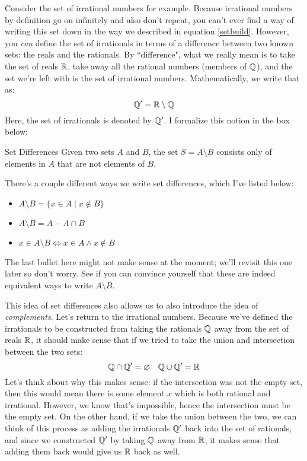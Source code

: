 Consider the set of irrational numbers for example. Because irrational numbers by definition go on infinitely 
and also don't repeat, you can't ever find a way of writing this set down in the way we described 
in equation \ref{setbuild}. However, you \textit{can} define the set of irrationals in terms of a difference 
between two known sets: the reals and the rationals. By	``difference", what we really mean is to take the set of 
reals \( \mathbb R \), take away all the rational numbers (members of \( \mathbb Q \)), and the set we're left with is the 
set of irrational numbers. Mathematically, we write that as:
\[
\mathbb Q' = \mathbb R \setminus \mathbb Q
\] 
Here, the set of irrationals is denoted by \( \mathbb Q' \). I formalize this notion in the box below:
\begin{definition}{Set Differences}{}
	Given two sets \( A \) and \( B \), the set \( S = A \setminus B \) consists only of elements in \( A \) that 
	are not elements of \( B \). 
\end{definition}
\begin{remark}{}{}
	There's a couple different ways we write set differences, which I've listed below:
	\begin{itemize}
		\item \( A \setminus B = \{x \in A \mid x \not \in B \}  \)
		\item \( A \setminus B = A - A \cap B \)
		\item \( x \in A \setminus B \iff x \in A \land x \not \in B \)
	\end{itemize}
	The last bullet here might not make sense at the moment; we'll revisit this one later so don't worry. See if you
	can convince yourself that these are indeed equivalent ways to write \( A \setminus B \).  
\end{remark}
This idea of set differences also allows us to also introduce the idea of \textit{complements}. Let's return to the 
irrational numbers. Because we've defined the irrationals to be constructed from taking the rationals \( \mathbb Q \) 
away from the set of reals \( \mathbb R \), it should make sense that if we tried to take the union and intersection  
between the two sets: 
\[
\mathbb Q \cap \mathbb Q' = \varnothing \quad \mathbb Q \cup \mathbb Q' = \mathbb R
\] 
Let's think about why this makes sense: if the intersection was not the empty set, then this would mean there 
is some element \( x \) which is both rational and irrational. However, we know that's impossible, hence the 
intersection must be the empty set.
On the other hand, if we take the union between the two, we can think of this process as adding the 
irrationals \( \mathbb Q' \) back into the set of rationals, and since we constructed \( \mathbb Q' \) by taking \( \mathbb Q \) away 
from \( \mathbb R \), it makes sense that adding them back would give us \( \mathbb R \) back as well. 
 
